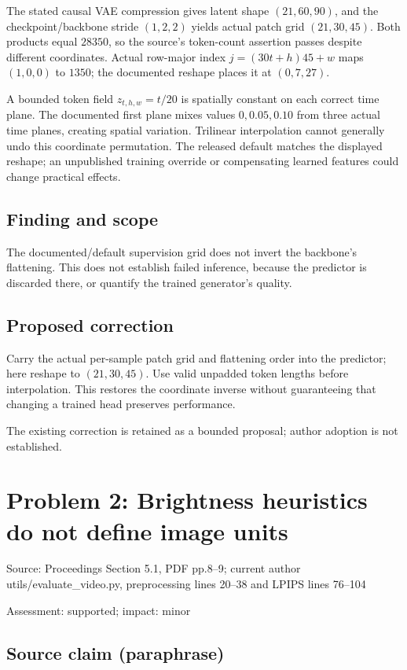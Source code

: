 \documentclass[11pt]{article}
\begin{document}
The stated causal VAE compression gives latent shape \((21,60,90)\), and the checkpoint/backbone stride \((1,2,2)\) yields actual patch grid \((21,30,45)\). Both products equal \(28350\), so the source’s token-count assertion passes despite different coordinates. Actual row-major index \(j=(30t+h)45+w\) maps \((1,0,0)\) to \(1350\); the documented reshape places it at \((0,7,27)\).

A bounded token field \(z_{t,h,w}=t/20\) is spatially constant on each correct time plane. The documented first plane mixes values \(0,0.05,0.10\) from three actual time planes, creating spatial variation. Trilinear interpolation cannot generally undo this coordinate permutation. The released default matches the displayed reshape; an unpublished training override or compensating learned features could change practical effects.

\subsection*{Finding and scope}

The documented/default supervision grid does not invert the backbone’s flattening. This does not establish failed inference, because the predictor is discarded there, or quantify the trained generator’s quality.

\subsection*{Proposed correction}

Carry the actual per-sample patch grid and flattening order into the predictor; here reshape to \((21,30,45)\). Use valid unpadded token lengths before interpolation. This restores the coordinate inverse without guaranteeing that changing a trained head preserves performance.

The existing correction is retained as a bounded proposal; author adoption is not established.

\section*{Problem 2: Brightness heuristics do not define image units}

Source: Proceedings Section 5.1, PDF pp.8–9; current author utils/evaluate\_video.py, preprocessing lines 20–38 and LPIPS lines 76–104

Assessment: supported; impact: minor

\subsection*{Source claim (paraphrase)}
\end{document}
